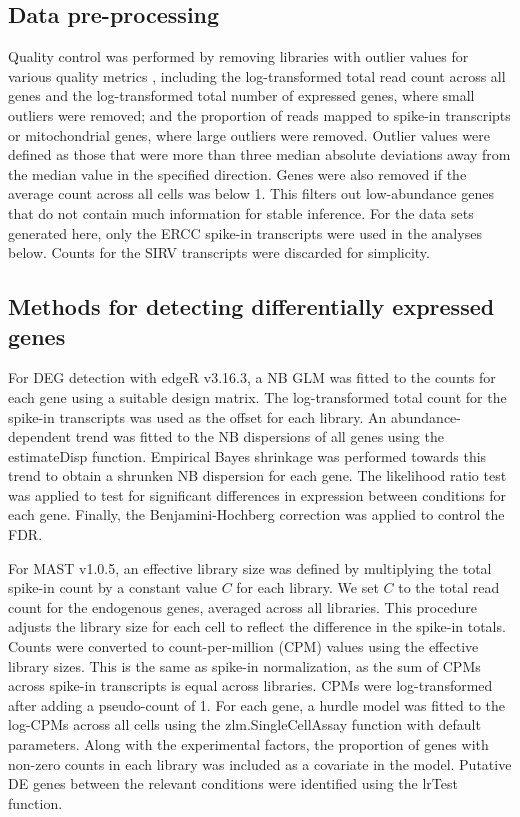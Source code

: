 \documentclass{article}
\begin{document}
\subsection{Data pre-processing}
Quality control was performed by removing libraries with outlier values for various quality metrics \cite{lun2016stepbystep}, including 
the log-transformed total read count across all genes and the log-transformed total number of expressed genes, where small outliers were removed; 
and the proportion of reads mapped to spike-in transcripts or mitochondrial genes, where large outliers were removed.
Outlier values were defined as those that were more than three median absolute deviations away from the median value in the specified direction.
Genes were also removed if the average count across all cells was below 1.
This filters out low-abundance genes that do not contain much information for stable inference.
For the data sets generated here, only the ERCC spike-in transcripts were used in the analyses below.
Counts for the SIRV transcripts were discarded for simplicity.

\subsection{Methods for detecting differentially expressed genes}
For DEG detection with edgeR v3.16.3, a NB GLM was fitted to the counts for each gene \cite{mccarthy2012differential} using a suitable design matrix.
The log-transformed total count for the spike-in transcripts was used as the offset for each library.
An abundance-dependent trend was fitted to the NB dispersions of all genes using the estimateDisp function.
Empirical Bayes shrinkage was performed towards this trend to obtain a shrunken NB dispersion for each gene.
The likelihood ratio test was applied to test for significant differences in expression between conditions for each gene. 
Finally, the Benjamini-Hochberg correction was applied to control the FDR.

For MAST v1.0.5, an effective library size was defined by multiplying the total spike-in count by a constant value $C$ for each library.
We set $C$ to the total read count for the endogenous genes, averaged across all libraries.
This procedure adjusts the library size for each cell to reflect the difference in the spike-in totals.
Counts were converted to count-per-million (CPM) values using the effective library sizes.
This is the same as spike-in normalization, as the sum of CPMs across spike-in transcripts is equal across libraries.
CPMs were log-transformed after adding a pseudo-count of 1.
For each gene, a hurdle model was fitted to the log-CPMs across all cells using the zlm.SingleCellAssay function with default parameters.
Along with the experimental factors, the proportion of genes with non-zero counts in each library was included as a covariate \cite{finak2015mast} in the model.
Putative DE genes between the relevant conditions were identified using the lrTest function.
\end{document}
